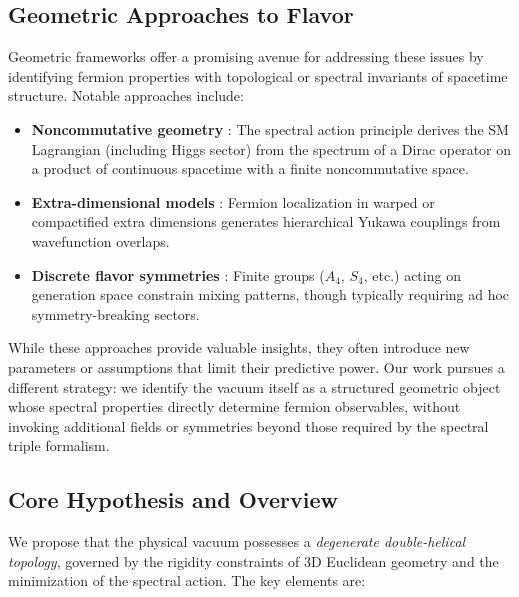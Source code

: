 \documentclass[12pt, a4paper]{article}
\theoremstyle{definition}
\begin{document}
\subsection{Geometric Approaches to Flavor}
Geometric frameworks offer a promising avenue for addressing these issues by identifying fermion properties with topological or spectral invariants of spacetime structure. Notable approaches include:
\begin{itemize}
    \item \textbf{Noncommutative geometry} \cite{connes,chamseddine}: The spectral action principle derives the SM Lagrangian (including Higgs sector) from the spectrum of a Dirac operator on a product of continuous spacetime with a finite noncommutative space.
    \item \textbf{Extra-dimensional models} \cite{arkani-hamed,randall-sundrum}: Fermion localization in warped or compactified extra dimensions generates hierarchical Yukawa couplings from wavefunction overlaps.
    \item \textbf{Discrete flavor symmetries} \cite{altarelli,king}: Finite groups ($A_4$, $S_4$, etc.) acting on generation space constrain mixing patterns, though typically requiring ad hoc symmetry-breaking sectors.
\end{itemize}

While these approaches provide valuable insights, they often introduce new parameters or assumptions that limit their predictive power. Our work pursues a different strategy: we identify the vacuum itself as a structured geometric object whose spectral properties directly determine fermion observables, without invoking additional fields or symmetries beyond those required by the spectral triple formalism.

\subsection{Core Hypothesis and Overview}
We propose that the physical vacuum possesses a \textit{degenerate double-helical topology}, governed by the rigidity constraints of 3D Euclidean geometry and the minimization of the spectral action. The key elements are:
\end{document}

